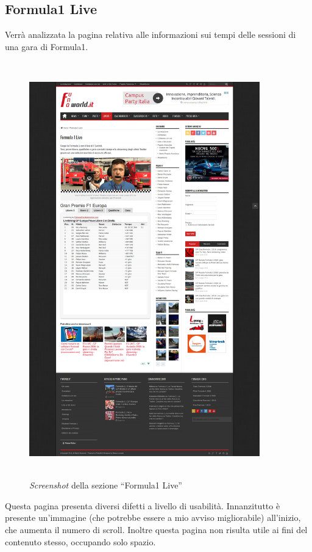 \subsection{Formula1 Live}

Verrà analizzata la pagina relativa alle informazioni sui tempi delle sessioni
di una gara di Formula1.

\begin{figure}[H]
  \centering
  \includegraphics[height=18cm, width=10cm]{res/img/Formula1Live_Full}
  \caption{\textit{Screenshot} della sezione ``Formula1 Live''}
\end{figure}

Questa pagina presenta diversi difetti a livello di usabilità.
Innanzitutto è presente un'immagine (che potrebbe essere a mio avviso
migliorabile) all'inizio, che aumenta il numero di scroll. Inoltre
questa pagina non risulta utile ai fini del contenuto stesso, occupando solo
spazio.

